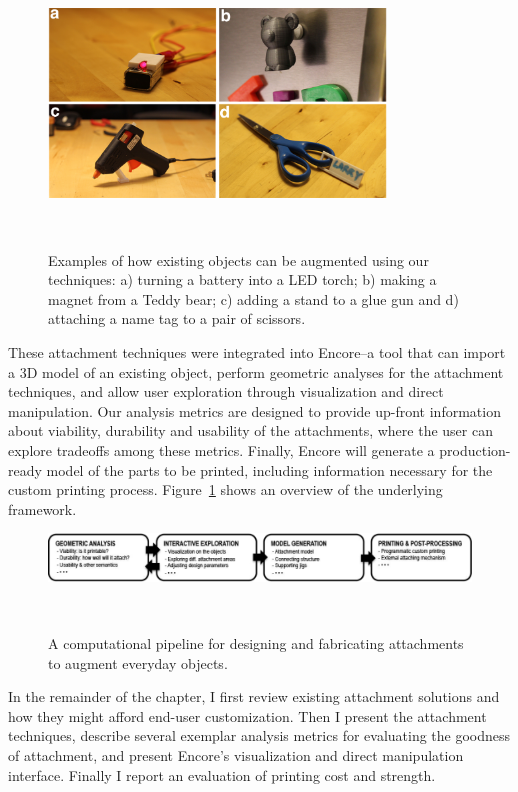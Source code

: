 \begin{figure}[h]
  \centering
  \includegraphics[width=0.8\textwidth]{figures/encore_overview.pdf}
  \caption{Examples of how existing objects can be augmented using our techniques: a) turning a battery into a LED torch; b) making a magnet from a Teddy bear; c) adding a stand to a glue gun and d) attaching a name tag to a pair of scissors. }~\label{fig:encore_overview}
\end{figure}


These attachment techniques were integrated into Encore--a tool that can import a 3D model of an existing object, perform geometric analyses for the attachment techniques, and allow user exploration through visualization and direct manipulation. Our analysis metrics are designed to provide up-front information about viability, durability and usability of the attachments, where the user can explore tradeoffs among these metrics. Finally, Encore will generate a production-ready model of the parts to be printed, including information necessary for the custom printing process. Figure~\ref{fig:encore_overview} shows an overview of the underlying framework.

\begin{figure}[h]
  \centering
  \includegraphics[width=\textwidth]{figures/encore_workflow.pdf}
  \caption{A computational pipeline for designing and fabricating attachments to augment everyday objects. }~\label{fig:encore_workflow}
\end{figure}

In the remainder of the chapter, I first review existing attachment solutions and how they might afford end-user customization. Then I present the attachment techniques, describe several exemplar analysis metrics for evaluating the goodness of attachment, and present Encore's visualization and direct manipulation interface. Finally I report an evaluation of printing cost and strength.


